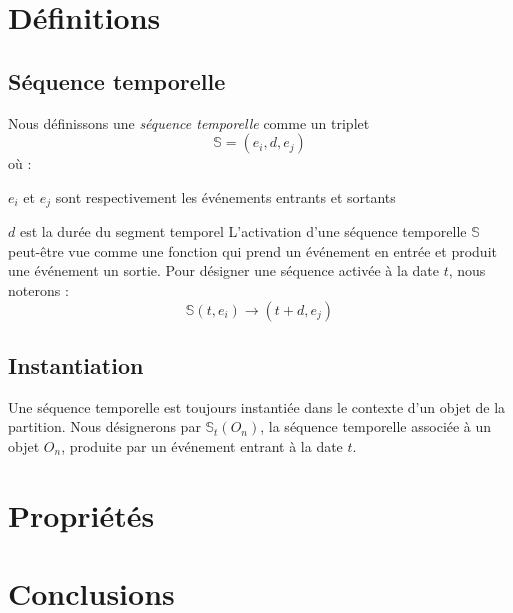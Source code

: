 \documentclass{article}
\let\olditemize\itemize
\let\oldenditemize\enditemize
\renewenvironment{itemize} 	{\olditemize \renewcommand{\labelitemi}{$\bullet$} \setlength{\itemsep}{0mm}}{\oldenditemize}
\begin{document}
\section{Définitions}
\subsection{Séquence temporelle}
Nous définissons une \emph{séquence temporelle} comme un triplet
\[\mathbb{S} = ( e_i, d, e_j )\]
où :
\begin{itemize}
	\item $e_i$ et $e_j$ sont respectivement les événements entrants et sortants 
	\item $d$ est la durée du segment temporel
\end{itemize}
L'activation d'une séquence temporelle $\mathbb{S}$ peut-être vue comme une fonction qui prend un événement en entrée et produit une événement un sortie.
Pour désigner une séquence activée à la date $t$, nous noterons : 
\begin{equation}
\mathbb{S}(t, e_i) \rightarrow (t + d, e_j)
\label{eq1}
\end{equation}

\subsection{Instantiation}
Une séquence temporelle est toujours instantiée dans le contexte d'un objet de la partition. Nous désignerons par $\mathbb{S}_t(O_n)$, la séquence temporelle associée à un objet $O_n$, produite par un événement entrant à la date $t$.\\





\section{Propriétés}



\section{Conclusions}




\end{document}
